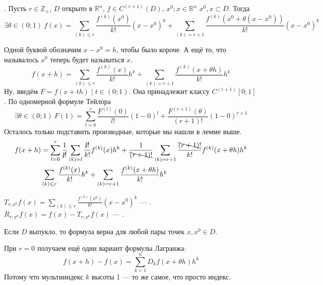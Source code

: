 \documentclass{article}
\begin{document}
\begin{itemize}
\begin{Proof}
        \end{Proof}
        \thm {}. Пусть $r\in\mathbb Z_+$, $D$ открыто в $\mathbb R^n$, $f\in C^{(r+1)}(D)$, $x^0;x\in\mathbb R^n$ $\overline{x^0,x}\subset D$. Тогда
        $$
        \exists\theta\in(0;1)~f(x)=\sum\limits_{(k)\leqslant r}\frac{f^{(k)}(x^0)}{k!}(x-x^0)^k+\sum\limits_{(k)=r+1}\frac{f^{(k)}(x^0+\theta(x-x^0))}{k!}(x-x^0)^k
        $$
        \begin{Proof}
            Одной буквой обозначим $x-x^0=h$, чтобы было короче. А ещё то, что называлось $x^0$ теперь будет называться $x$.
            $$
            f(x+h)=\sum\limits_{(k)\leqslant r}\frac{f^{(k)}(x)}{k!}h^k+\sum\limits_{(k)=r+1}\frac{f^{(k)}(x+\theta h)}{k!}h^k
            $$
            Ну, введём $F=f(x+th)\mid t\in(0;1)$. Она принадлежит классу $C^{(r+1)}[0;1]$. По одномерной формуле Тейлора
            $$
            \exists\theta\in(0;1)~F(1)=\sum\limits_{l=0}^r\frac{F^{(l)}(0)}{l!}(1-0)^l+\frac{F^{(r+1)}(\theta)}{(r+1)!}(1-0)^{r+1}
            $$
            Осталось только подставить производные, которые мы нашли в лемме выше.
            \[\begin{split}
                f(x+h)&=\sum\limits_{l=0}^r\frac1{\cancel{l!}}\sum\limits_{(k)=l}\frac{\cancel{l!}}{k!}f^{(k)}(x)h^k+\frac1{\bcancel{(r+1)!}}\sum\limits_{(k)=r+1}\frac{\bcancel{(r+1)!}}{k!}f^{(k)}(x+\theta h)h^k\\
                &\sum\limits_{(k)\leqslant r}\frac{f^{(k)}(x)}{k!}h^k+\sum\limits_{(k)=r+1}\frac{f^{(k)}(x+\theta h)}{k!}h^k
            \end{split}\]
        \end{Proof}
        \dfn $T_{r;x^0}f(x)=\sum\limits_{(k)\leqslant r}\frac{f^{(k)}(x^0)}{k!}(x-x^0)^k$ --- .
        \dfn $R_{r;x^0}f(x)=f(x)-T_{r;x^0}f(x)$ --- .
        \begin{Comment}
            Если $D$ выпукло, то формула верна для любой пары точек $x,x^0\in D$.
        \end{Comment}
        \begin{Comment}
            При $r=0$ получаем ещё один вариант формулы Лагранжа:
            $$
            f(x+h)-f(x)=\sum\limits_{k=1}^nD_kf(x+\theta h)h^k
            $$
            Потому что мультииндекс $k$ высоты 1 --- то же самое, что просто индекс.
        \end{Comment}
        \begin{Comment}

\end{Comment}
\end{itemize}
\end{document}
